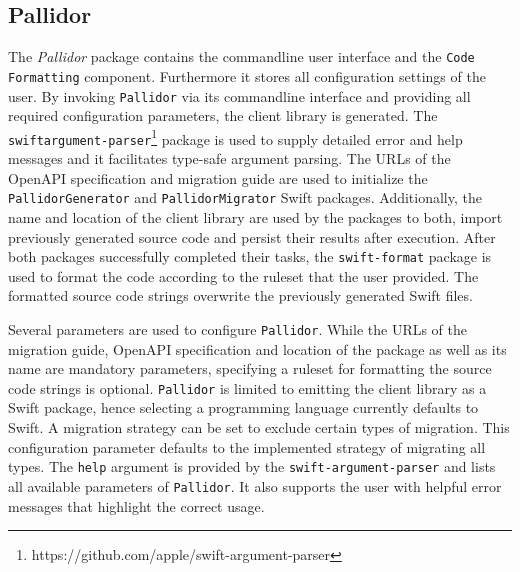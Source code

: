 \subsection{Pallidor}\label{subsec:Pallidor}
The \textit{Pallidor} package contains the commandline user interface and the \texttt{Code\- Formatting} component. Furthermore it stores all configuration settings of the user. By invoking \texttt{Pallidor} via its commandline interface and providing all required configuration parameters, the client library is generated. The \texttt{swift\-argument-parser}\footnote{https://github.com/apple/swift-argument-parser} package is used to supply detailed error and help messages and it facilitates type-safe argument parsing. The URLs of the OpenAPI specification and migration guide are used to initialize the \texttt{Pallidor\-Generator} and \texttt{Pallidor\-Migrator} Swift packages. Additionally, the name and location of the client library are used by the packages to both, import previously generated source code and persist their results after execution. After both packages successfully completed their tasks, the \texttt{swift-format} package is used to format the code according to the ruleset that the user provided. The formatted source code strings overwrite the previously generated Swift files.

Several parameters are used to configure \texttt{Pallidor}. While the URLs of the migration guide, OpenAPI specification and location of the package as well as its name are mandatory parameters, specifying a ruleset for formatting the source code strings is optional. \texttt{Pallidor} is limited to emitting the client library as a Swift package, hence selecting a programming language currently defaults to Swift. A migration strategy can be set to exclude certain types of migration. This configuration parameter defaults to the implemented strategy of migrating all types. The \texttt{help} argument is provided by the \texttt{swift-argument-parser} and lists all available parameters of \texttt{Pallidor}. It also supports the user with helpful error messages that highlight the correct usage.

